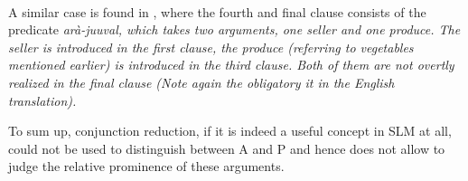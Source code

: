  \\

A similar case is found in , where the fourth and final clause consists of the predicate \em arà-juuval, \em which takes two arguments, one seller and one produce. The seller  is introduced in the first clause, the produce  (referring to vegetables mentioned earlier) is introduced in the third clause. Both of them are not overtly realized in the final clause (Note again the obligatory \em it \em in the English translation).



To sum up, conjunction reduction, if it is indeed a useful concept in SLM at all, could not be used to distinguish between A and P and hence does not allow to judge the relative prominence of these arguments.


